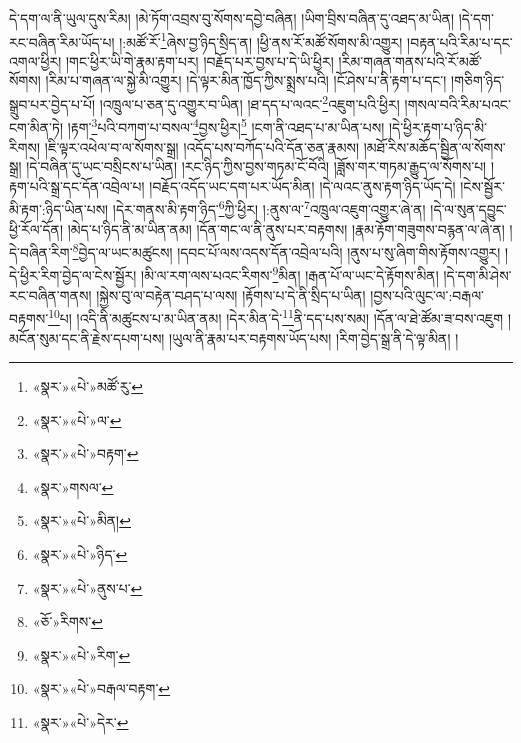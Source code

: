 དེ་དག་ལ་ནི་ཡུལ་དུས་རིམ། །མེ་ཏོག་འབྲས་བུ་སོགས་དབྱེ་བཞིན། །ཡིག་བྲིས་བཞིན་དུ་འཐད་མ་ཡིན། །དེ་དག་རང་བཞིན་རིམ་ཡོད་པ། །:མཚོ་རོ་\footnote{«སྣར་»«པེ་»མཚོ་རུ་}ཞེས་བྱ་ཉིད་སྲིད་ན། །ཕྱི་ནས་རོ་མཚོ་སོགས་མི་འགྱུར། །བརྟན་པའི་རིམ་པ་དང་འགལ་ཕྱིར། །གང་ཕྱིར་ཡི་གེ་རྣམ་རྟག་པར། །བརྗོད་པར་བྱས་པ་དེ་ཡི་ཕྱིར། །རིམ་གཞན་གནས་པའི་རོ་མཚོ་སོགས། །རིམ་པ་གཞན་ལ་སྐྱེ་མི་འགྱུར། །དེ་ལྟར་མིན་ཁྱོད་ཀྱིས་སྨྲས་པའི། །ངོ་ཤེས་པ་ནི་རྟག་པ་དང་། །གཅིག་ཉིད་སྒྲུབ་པར་བྱེད་པ་པོ། །འཁྲུལ་པ་ཅན་དུ་འགྱུར་བ་ཡིན། །ཐ་དད་པ་ལའང་\footnote{«སྣར་»«པེ་»ལ་}འཇུག་པའི་ཕྱིར། །གསལ་བའི་རིམ་པའང་ངག་མིན་ཏེ། །རྟག་\footnote{«སྣར་»«པེ་»བརྟག་}པའི་བཀག་པ་བསལ་\footnote{«སྣར་»གསལ་}བྱས་ཕྱིར།\footnote{«སྣར་»«པེ་»མིན།} །ངག་ནི་འཐད་པ་མ་ཡིན་པས། །དེ་ཕྱིར་རྟག་པ་ཉིད་མི་རིགས། །ཇི་ལྟར་འཕེལ་བ་ལ་སོགས་སྒྲ། །འདོད་པས་བཀོད་པའི་དོན་ཅན་རྣམས། །མཐོ་རིས་མཆོད་སྦྱིན་ལ་སོགས་སྒྲ། །དེ་བཞིན་དུ་ཡང་བསྲིངས་པ་ཡིན། །རང་ཉིད་ཀྱིས་བྱས་གཏམ་ངོ་བོའི། །ཟློས་གར་གཏམ་རྒྱུད་ལ་སོགས་པ། །རྟག་པའི་སྒྲ་དང་དོན་འབྲེལ་པ། །བརྗོད་འདོད་ཡང་དག་པར་ཡོད་མིན། །དེ་ལའང་ནུས་རྟག་ཉིད་ཡོད་དེ། །ངེས་སྦྱོར་མི་རྟག་:ཉིད་ཡིན་པས། །དེར་གནས་མི་རྟག་ཉིད་\footnote{«སྣར་»«པེ་»ཉིད་}ཀྱི་ཕྱིར། །:ནུས་ལ་\footnote{«སྣར་»«པེ་»ནུས་པ་}འཁྲུལ་འཇུག་འགྱུར་ཞེ་ན། །དེ་ལ་སུན་དབྱུང་ཕྱི་རོལ་དོན། །མེད་པ་ཉིད་ནི་མ་ཡིན་ནམ། །དོན་གང་ལ་ནི་ནུས་པར་བརྟགས། །རྣམ་རྟོག་གཟུགས་བརྙན་ལ་ཞེ་ན། །དེ་བཞིན་རིག་\footnote{«ཅོ་»རིགས་}བྱེད་ལ་ཡང་མཚུངས། །དབང་པོ་ལས་འདས་དོན་འབྲེལ་པའི། །ནུས་པ་སུ་ཞིག་གིས་རྟོགས་འགྱུར། །དེ་ཕྱིར་རིག་བྱེད་ལ་ངེས་སྦྱོར། །མི་ལ་རག་ལས་པའང་རིགས་\footnote{«སྣར་»«པེ་»རིག་}མིན། །རྒན་པོ་ལ་ཡང་དེ་རྟོགས་མིན། །དེ་དག་མི་ཤེས་རང་བཞིན་གནས། །སྐྱེས་བུ་ལ་བརྟེན་བཤད་པ་ལས། །རྟོགས་པ་དེ་ནི་སྲིད་པ་ཡིན། །བྱས་པའི་ལུང་ལ་:བརྒལ་བརྟགས་\footnote{«སྣར་»«པེ་»བརྒལ་བརྟག་}པ། །འདི་ནི་མཚུངས་པ་མ་ཡིན་ནམ། །དེར་མིན་དེ་\footnote{«སྣར་»«པེ་»དེར་}ནི་དད་པས་སམ། །དོན་ལ་ཐེ་ཚོམ་ཟ་བས་འཇུག །མངོན་སུམ་དང་ནི་རྗེས་དཔག་པས། །ཡུལ་ནི་རྣམ་པར་བརྟགས་ཡོད་པས། །རིག་བྱེད་སྒྲ་ནི་དེ་ལྟ་མིན། །
